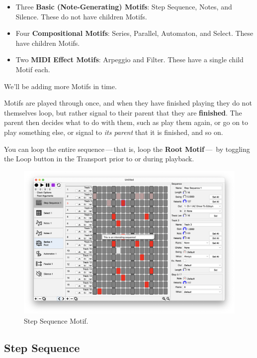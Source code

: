\documentclass[twoside,10pt]{article}
\begin{document}
\begin{itemize}
\item Three {\bf Basic (Note-Generating) Motifs}: Step Sequence, Notes, and Silence.  These do not have children Motifs.
\item Four {\bf Compositional Motifs}: Series, Parallel, Automaton, and Select.  These have children Motifs.
\item Two {\bf MIDI Effect Motifs}: Arpeggio and Filter.  These have a single child Motif each.
\end{itemize}

We'll be adding more Motifs in time.

\vspace{1em}

Motifs are played through once, and when they have finished playing they do not themselves loop, but rather signal to their parent that they are {\bf finished}.  The parent then decides what to do with them, such as play them again, or go on to play something else, or signal to {\it its parent} that it is finished, and so on.

You can loop the entire sequence\,---\,that is, loop the {\bf Root Motif}\,---\, by toggling the Loop button in the Transport prior to or during playback.

\clearpage

\begin{figure}[t]
\centering
\includegraphics[width=6.5in]{StepSequence}
\vspace{-2em}
\caption{Step Sequence Motif.}
\label{stepsequence}
\end{figure}

\subsection{Step Sequence}
\end{document}
